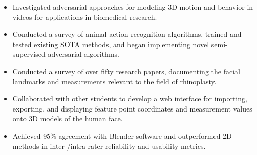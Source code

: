 \begin{itemize}
\item Investigated adversarial approaches for modeling 3D motion and behavior in videos for applications in biomedical research.
\item Conducted a survey of animal action recognition algorithms, trained and tested existing SOTA methods, and began implementing novel semi-supervised adversarial algorithms.
\end{itemize}
\begin{itemize}
\item Conducted a survey of over fifty research papers, documenting the facial landmarks and measurements relevant to the field of rhinoplasty.
\item Collaborated with other students to develop a web interface for importing, exporting, and displaying feature point coordinates and measurement values onto 3D models of the human face.
\item Achieved 95\% agreement with Blender software and outperformed 2D methods in inter-/intra-rater reliability and usability metrics.
\end{itemize}
